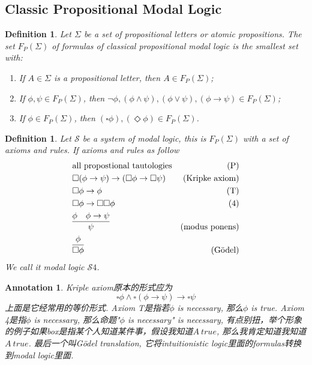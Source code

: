 \documentclass{article}
\theoremstyle{plain}
\newtheorem{definition}[theorem]{Definition}
\newtheorem{annotation}[theorem]{Annotation}
\theoremstyle{nonumberplain}
\begin{document}
\newpage
\subsection{Classic Propositional Modal Logic}


\begin{definition}
\rm \cite{15-816-cml}Let $\Sigma$ be a set of propositional letters or atomic propositions. The set $F_P(\Sigma)$ of formulas of classical propositional modal logic is the smallest set with:
\begin{enumerate}
	\item If $A \in \Sigma$ is a propositional letter, then $A \in F_P(\Sigma)$;
	\item If $\phi,\psi \in F_P(\Sigma)$, then $\neg \phi, (\phi \wedge \psi), (\phi \vee \psi), (\phi \to \psi) \in F_P(\Sigma)$;
	\item If $\phi \in F_P(\Sigma)$, then $(\square \phi),(\Diamond \phi) \in F_P(\Sigma)$. 
\end{enumerate}
\end{definition}

\begin{definition}
\rm Let $\mathcal{S}$ be a system of modal logic, this is $F_P(\Sigma)$ with a set of axioms and rules. If axioms and rules as follow
$$
\begin{aligned}
&\text{all propostional tautologies}&(\text{P}) \\
&\square(\phi \to \psi) \to (\square\phi \to \square\psi)& (\text{Kripke axiom})\\
&\square\phi \to \phi & (\text{T}) \\
&\square\phi \to \square\square\phi &(4) \\
&\infer{\psi}{\phi & \phi \to \psi} & (\text{modus ponens})\\
&\infer{\square \phi}{\phi} & (\text{G\"{o}del}) 
\end{aligned}
$$
We call it modal logic $\mathcal{S}4$.
\end{definition}


\begin{annotation}
\rm Kriple axiom原本的形式应为
$$
\square \phi \wedge \square(\phi \to \psi) \to \square \psi
$$
上面是它经常用的等价形式. Axiom T是指若$\phi$ is necessary, 那么$\phi$ is true. Axiom 4是指$\phi$ is necessary, 那么命题"$\phi$ is necessary" is necessary, 有点别扭，举个形象的例子如果box是指某个人知道某件事，假设我知道$A~true$, 那么我肯定知道我知道$A~true$. 最后一个叫G\"{o}del translation, 它将intuitionistic logic里面的formulas转换到modal logic里面. 
\end{annotation}
\end{document}
